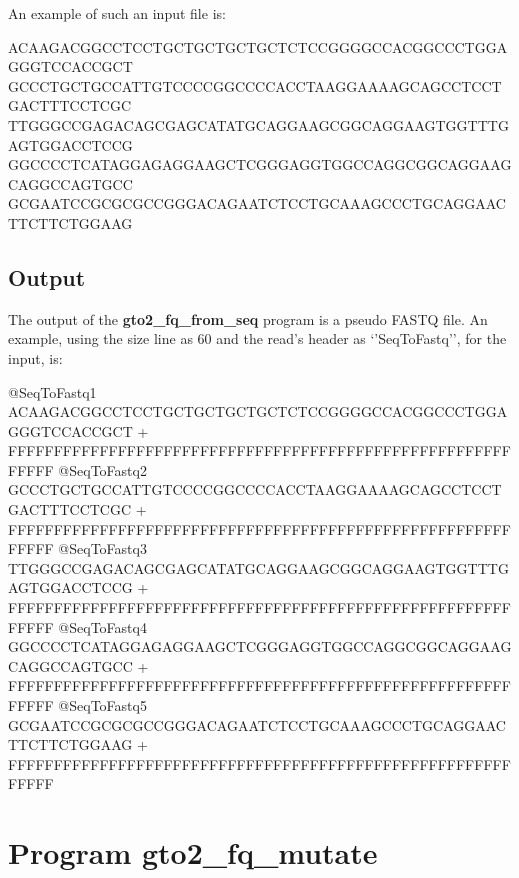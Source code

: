 \documentclass[11pt,]{krantz}
\newenvironment{Shaded}{\begin{snugshade}}{\end{snugshade}}
\newcommand{\ExtensionTok}[1]{#1}
\begin{document}
An example of such an input file is:

\begin{Shaded}
\begin{Highlighting}[]
\ExtensionTok{ACAAGACGGCCTCCTGCTGCTGCTGCTCTCCGGGGCCACGGCCCTGGAGGGTCCACCGCT}
\ExtensionTok{GCCCTGCTGCCATTGTCCCCGGCCCCACCTAAGGAAAAGCAGCCTCCTGACTTTCCTCGC}
\ExtensionTok{TTGGGCCGAGACAGCGAGCATATGCAGGAAGCGGCAGGAAGTGGTTTGAGTGGACCTCCG}
\ExtensionTok{GGCCCCTCATAGGAGAGGAAGCTCGGGAGGTGGCCAGGCGGCAGGAAGCAGGCCAGTGCC}
\ExtensionTok{GCGAATCCGCGCGCCGGGACAGAATCTCCTGCAAAGCCCTGCAGGAACTTCTTCTGGAAG}
\end{Highlighting}
\end{Shaded}

\subsection*{Output}\label{output-9}


The output of the \textbf{gto2\_fq\_from\_seq} program is a pseudo FASTQ
file. An example, using the size line as 60 and the read's header as
`'SeqToFastq'', for the input, is:

\begin{Shaded}
\begin{Highlighting}[]
\ExtensionTok{@SeqToFastq1}
\ExtensionTok{ACAAGACGGCCTCCTGCTGCTGCTGCTCTCCGGGGCCACGGCCCTGGAGGGTCCACCGCT}
\ExtensionTok{+}
\ExtensionTok{FFFFFFFFFFFFFFFFFFFFFFFFFFFFFFFFFFFFFFFFFFFFFFFFFFFFFFFFFFFF}
\ExtensionTok{@SeqToFastq2}
\ExtensionTok{GCCCTGCTGCCATTGTCCCCGGCCCCACCTAAGGAAAAGCAGCCTCCTGACTTTCCTCGC}
\ExtensionTok{+}
\ExtensionTok{FFFFFFFFFFFFFFFFFFFFFFFFFFFFFFFFFFFFFFFFFFFFFFFFFFFFFFFFFFFF}
\ExtensionTok{@SeqToFastq3}
\ExtensionTok{TTGGGCCGAGACAGCGAGCATATGCAGGAAGCGGCAGGAAGTGGTTTGAGTGGACCTCCG}
\ExtensionTok{+}
\ExtensionTok{FFFFFFFFFFFFFFFFFFFFFFFFFFFFFFFFFFFFFFFFFFFFFFFFFFFFFFFFFFFF}
\ExtensionTok{@SeqToFastq4}
\ExtensionTok{GGCCCCTCATAGGAGAGGAAGCTCGGGAGGTGGCCAGGCGGCAGGAAGCAGGCCAGTGCC}
\ExtensionTok{+}
\ExtensionTok{FFFFFFFFFFFFFFFFFFFFFFFFFFFFFFFFFFFFFFFFFFFFFFFFFFFFFFFFFFFF}
\ExtensionTok{@SeqToFastq5}
\ExtensionTok{GCGAATCCGCGCGCCGGGACAGAATCTCCTGCAAAGCCCTGCAGGAACTTCTTCTGGAAG}
\ExtensionTok{+}
\ExtensionTok{FFFFFFFFFFFFFFFFFFFFFFFFFFFFFFFFFFFFFFFFFFFFFFFFFFFFFFFFFFFF}
\end{Highlighting}
\end{Shaded}

\section{Program gto2\_fq\_mutate}\label{program-gto2_fq_mutate}
\end{document}
